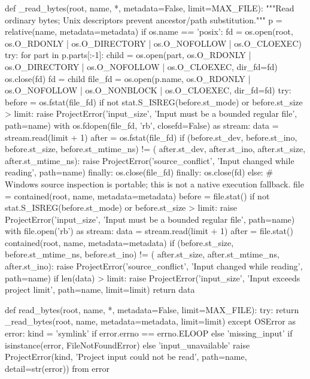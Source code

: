 def _read_bytes(root, name, *, metadata=False, limit=MAX_FILE):
    """Read ordinary bytes; Unix descriptors prevent ancestor/path substitution."""
    p = relative(name, metadata=metadata)
    if os.name == 'posix':
        fd = os.open(root, os.O_RDONLY | os.O_DIRECTORY | os.O_NOFOLLOW | os.O_CLOEXEC)
        try:
            for part in p.parts[:-1]:
                child = os.open(part, os.O_RDONLY | os.O_DIRECTORY | os.O_NOFOLLOW | os.O_CLOEXEC,
                                dir_fd=fd)
                os.close(fd)
                fd = child
            file_fd = os.open(p.name, os.O_RDONLY | os.O_NOFOLLOW | os.O_NONBLOCK | os.O_CLOEXEC, dir_fd=fd)
            try:
                before = os.fstat(file_fd)
                if not stat.S_ISREG(before.st_mode) or before.st_size > limit:
                    raise ProjectError('input_size', 'Input must be a bounded regular file', path=name)
                with os.fdopen(file_fd, 'rb', closefd=False) as stream:
                    data = stream.read(limit + 1)
                after = os.fstat(file_fd)
                if (before.st_dev, before.st_ino, before.st_size, before.st_mtime_ns) != (
                        after.st_dev, after.st_ino, after.st_size, after.st_mtime_ns):
                    raise ProjectError('source_conflict', 'Input changed while reading', path=name)
            finally:
                os.close(file_fd)
        finally:
            os.close(fd)
    else:
        # Windows source inspection is portable; this is not a native execution fallback.
        file = contained(root, name, metadata=metadata)
        before = file.stat()
        if not stat.S_ISREG(before.st_mode) or before.st_size > limit:
            raise ProjectError('input_size', 'Input must be a bounded regular file', path=name)
        with file.open('rb') as stream:
            data = stream.read(limit + 1)
        after = file.stat()
        contained(root, name, metadata=metadata)
        if (before.st_size, before.st_mtime_ns, before.st_ino) != (
                after.st_size, after.st_mtime_ns, after.st_ino):
            raise ProjectError('source_conflict', 'Input changed while reading', path=name)
    if len(data) > limit:
        raise ProjectError('input_size', 'Input exceeds project limit', path=name, limit=limit)
    return data


def read_bytes(root, name, *, metadata=False, limit=MAX_FILE):
    try:
        return _read_bytes(root, name, metadata=metadata, limit=limit)
    except OSError as error:
        kind = 'symlink' if error.errno == errno.ELOOP else 'missing_input' if isinstance(error, FileNotFoundError) else 'input_unavailable'
        raise ProjectError(kind, 'Project input could not be read', path=name, detail=str(error)) from error


